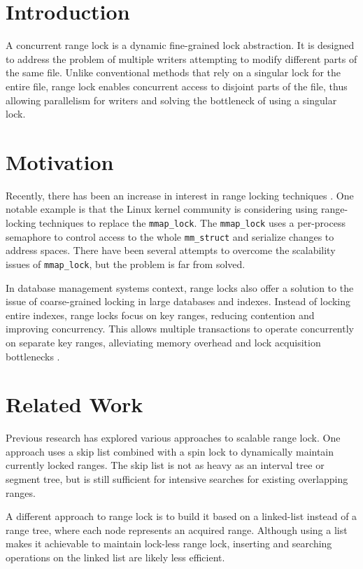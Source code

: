 \section{Introduction}

A concurrent range lock is a dynamic fine-grained lock abstraction. It is designed to address the problem of multiple writers attempting to modify different parts of the same file. Unlike conventional methods that rely on a singular lock for the entire file, range lock enables concurrent access to disjoint parts of the file, thus allowing parallelism for writers and solving the bottleneck of using a singular lock. 

\section{Motivation}
Recently, there has been an increase in interest in range locking techniques \parencite{readerWriterLocks2017, mapleTree2021, mmapLock2022}. One notable example is that the Linux kernel community is considering using range-locking techniques to replace the \texttt{mmap\_lock}. The \texttt{mmap\_lock} uses a per-process semaphore to control access to the whole \texttt{mm\_struct}\parencite{mmstruct2023} and serialize changes to address spaces. There have been several attempts to overcome the scalability issues of \texttt{mmap\_lock}, but the problem is far from solved\parencite{mmapLock2022}.

In database management systems context, range locks also offer a solution to the issue of coarse-grained locking in large databases and indexes. Instead of locking entire indexes, range locks focus on key ranges, reducing contention and improving concurrency. This allows multiple transactions to operate concurrently on separate key ranges, alleviating memory overhead and lock acquisition bottlenecks \parencite{Graefe2020}.

\section{Related Work}
Previous research has explored various approaches to scalable range lock. One approach uses a skip list combined with a spin lock to dynamically maintain currently locked ranges\parencite{migrationWM2023}. The skip list is not as heavy as an interval tree or segment tree, but is still sufficient for intensive searches for existing overlapping ranges.

A different approach to range lock is to build it based on a linked-list instead of a range tree, where each node represents an acquired range\parencite{scalableRangeLock2020}. Although using a list makes it achievable to maintain lock-less range lock, inserting and searching operations on the linked list are likely less efficient.

